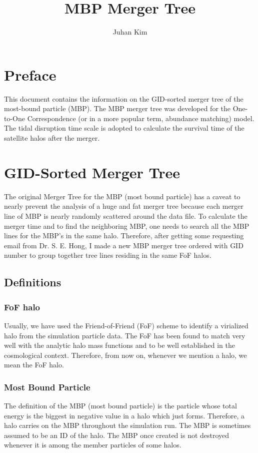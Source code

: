 \documentclass[openleft]{memoir}
\begin{document}
\frontmatter
\title{MBP Merger Tree}
\author{Juhan Kim}
\maketitle

\chapter{Preface}
This document contains the information on the GID-sorted merger tree of the most-bound particle (MBP).
The MBP merger tree was developed for the One-to-One Correspondence (or in a 
more popular term, abundance matching) model.
The tidal disruption time scale is adopted to calculate the survival time of the satellite halos after the merger.

\mainmatter
\chapter{GID-Sorted Merger Tree}
The original Merger Tree for the MBP (most bound particle) has a caveat to nearly prevent the analysis of a huge and fat merger tree
because each merger line of MBP is nearly randomly scattered around the data file. To calculate the merger time and to find the
neighboring MBP, one needs to search all the MBP lines for the MBP's in the same halo. 
Therefore, after getting some requesting
email from Dr. S. E. Hong, I made a new MBP merger tree ordered with GID number to group together tree lines residing in the same FoF halos.

\section{Definitions}
\subsection{FoF halo}
Usually, we have used the Friend-of-Friend (FoF) scheme to identify a virialized halo from the simulation particle data. 
The FoF has been found to match very well with the analytic halo mass functions and to be well established in the cosmological context.
Therefore, from now on, whenever we mention a halo, we mean the FoF halo.


\subsection{Most Bound Particle}
The definition of the MBP (most bound particle) is the particle whose total energy is the biggest in negative value
in a halo which just forms. Therefore, a halo carries on the MBP throughout the simulation run. 
The MBP is sometimes assumed to be an ID of the halo. The MBP once created is not destroyed whenever it 
is among the member particles of some halos. 
\end{document}
